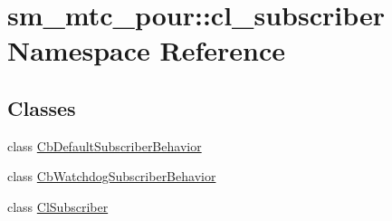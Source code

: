 \hypertarget{namespacesm__mtc__pour_1_1cl__subscriber}{}\section{sm\+\_\+mtc\+\_\+pour\+:\+:cl\+\_\+subscriber Namespace Reference}
\label{namespacesm__mtc__pour_1_1cl__subscriber}
\subsection*{Classes}
\begin{DoxyCompactItemize}
\item 
class \hyperlink{classsm__mtc__pour_1_1cl__subscriber_1_1CbDefaultSubscriberBehavior}{Cb\+Default\+Subscriber\+Behavior}
\item 
class \hyperlink{classsm__mtc__pour_1_1cl__subscriber_1_1CbWatchdogSubscriberBehavior}{Cb\+Watchdog\+Subscriber\+Behavior}
\item 
class \hyperlink{classsm__mtc__pour_1_1cl__subscriber_1_1ClSubscriber}{Cl\+Subscriber}
\end{DoxyCompactItemize}

